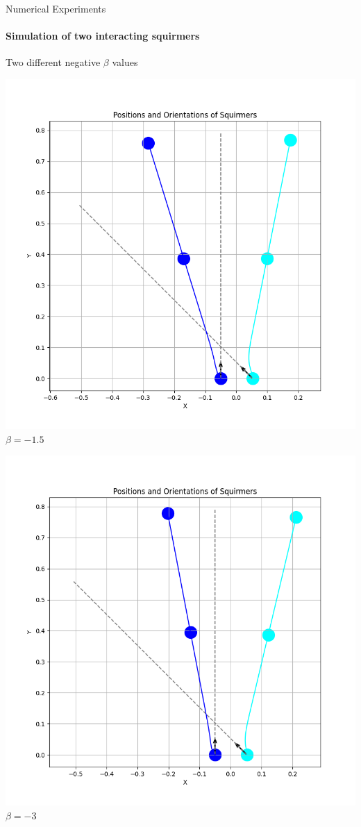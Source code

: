 \documentclass{beamer}
\begin{document}
\begin{frame}{Numerical Experiments}
    \framesubtitle{Simulation of two interacting squirmers}
    \begin{center}
        Two different negative $\beta$ values
    \end{center}
    \begin{minipage}{0.49\textwidth}
        \centering
        \includegraphics[width=1\textwidth]{../../graphs/simulations/sim_sq_sq/betam1_5/3pi_4_.png}
        $\beta = -1.5$
    \end{minipage}
    \begin{minipage}{0.49\textwidth}
        \centering
        \includegraphics[width=1\textwidth]{../../graphs/simulations/sim_sq_sq/betam3/3pi_4_.png}
        $\beta = -3$
    \end{minipage}
\end{frame}
\end{document}
